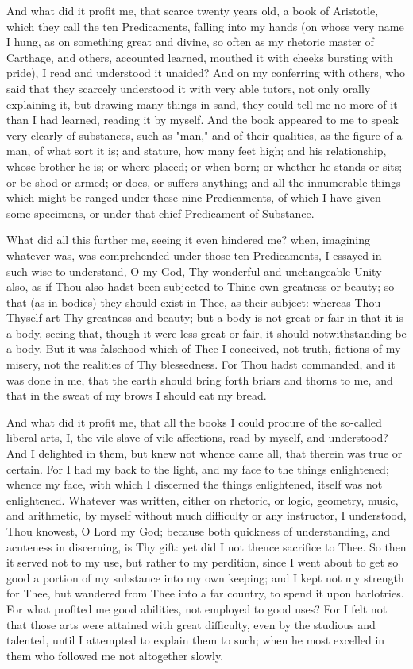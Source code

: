 \documentclass[b5paper,openright,12pt,twoside]{book}
\begin{document}
And what did it profit me, that scarce twenty years old, a book of
Aristotle, which they call the ten Predicaments, falling into my hands
(on whose very name I hung, as on something great and divine, so often
as my rhetoric master of Carthage, and others, accounted learned,
mouthed it with cheeks bursting with pride), I read and understood it
unaided? And on my conferring with others, who said that they scarcely
understood it with very able tutors, not only orally explaining it, but
drawing many things in sand, they could tell me no more of it than I had
learned, reading it by myself. And the book appeared to me to speak very
clearly of substances, such as "man," and of their qualities, as the
figure of a man, of what sort it is; and stature, how many feet high;
and his relationship, whose brother he is; or where placed; or when
born; or whether he stands or sits; or be shod or armed; or does, or
suffers anything; and all the innumerable things which might be ranged
under these nine Predicaments, of which I have given some specimens, or
under that chief Predicament of Substance.

What did all this further me, seeing it even hindered me? when,
imagining whatever was, was comprehended under those ten Predicaments,
I essayed in such wise to understand, O my God, Thy wonderful and
unchangeable Unity also, as if Thou also hadst been subjected to Thine
own greatness or beauty; so that (as in bodies) they should exist in
Thee, as their subject: whereas Thou Thyself art Thy greatness and
beauty; but a body is not great or fair in that it is a body, seeing
that, though it were less great or fair, it should notwithstanding be
a body. But it was falsehood which of Thee I conceived, not truth,
fictions of my misery, not the realities of Thy blessedness. For Thou
hadst commanded, and it was done in me, that the earth should bring
forth briars and thorns to me, and that in the sweat of my brows I
should eat my bread.

And what did it profit me, that all the books I could procure of the
so-called liberal arts, I, the vile slave of vile affections, read by
myself, and understood? And I delighted in them, but knew not whence
came all, that therein was true or certain. For I had my back to the
light, and my face to the things enlightened; whence my face, with which
I discerned the things enlightened, itself was not enlightened.
Whatever was written, either on rhetoric, or logic, geometry, music,
and arithmetic, by myself without much difficulty or any instructor,
I understood, Thou knowest, O Lord my God; because both quickness of
understanding, and acuteness in discerning, is Thy gift: yet did I not
thence sacrifice to Thee. So then it served not to my use, but rather
to my perdition, since I went about to get so good a portion of my
substance into my own keeping; and I kept not my strength for Thee, but
wandered from Thee into a far country, to spend it upon harlotries. For
what profited me good abilities, not employed to good uses? For I felt
not that those arts were attained with great difficulty, even by the
studious and talented, until I attempted to explain them to such; when
he most excelled in them who followed me not altogether slowly.
\end{document}
